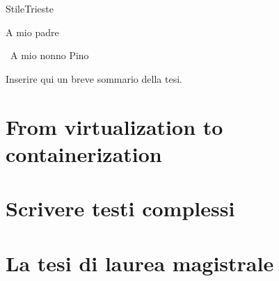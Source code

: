 \documentclass[cucitura%
]{toptesi}
\begin{document}

%



\expandafter\ifx\csname StileTrieste\endcsname\relax
    \frontespizio
\else
    \paginavuota
    \begin{dedica}
        A mio padre

        \textdagger\ A mio nonno Pino
    \end{dedica}
    \tomo
\fi


\sommario

Inserire qui un breve sommario della tesi.



\indici

\mainmatter

\chapter{From virtualization to containerization}



\chapter{Scrivere testi complessi}



\chapter{La tesi di laurea magistrale}
\end{document}
